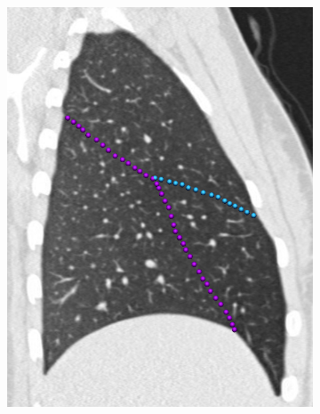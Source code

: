 {\begin{figure}[htbp]
\begin{subfigure}{.325\linewidth}
  \includegraphics[width=\linewidth,trim={{.0\wd0} {.0\wd0} {.0\wd0} {.0\wd0}},clip]{Segmentation/Image/FissureDigitising1.png}
  \caption{}
  \label{fig:LobeShapeGenereation-b} 
\end{subfigure}
\begin{subfigure}{.48\linewidth}%

\end{subfigure}
\end{figure}}
